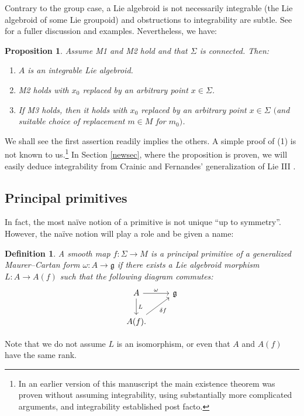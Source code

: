 \documentclass[11pt]{article}
\numberwithin{equation}{section}
\numberwithin{equation}{section}
\newtheorem{Proposition}[Theorem]{Proposition}
\newtheorem{Definition}[Theorem]{Definition}
\begin{document}
Contrary to the group case, a Lie algebroid is not necessarily
integrable (the Lie algebroid of some Lie groupoid) and obstructions
to integrability are subtle. See \cite{Crainic_Fernandes_11} for a
fuller discussion and examples. Nevertheless, we have:
\begin{Proposition}\label{frogP}
Assume {\normalfont M1} and {\normalfont M2} hold
and that $\Sigma$ is connected. Then:
 \begin{enumerate}\itemsep=0pt
 \item[$1.$] $A$ is an integrable Lie algebroid.%
 \item[$2.$] {\normalfont M2} holds with $x_0$ replaced by an arbitrary
point $x \in \Sigma $.%
 \item[$3.$] If {\normalfont M3} holds, then it holds with $x_0$
replaced by an arbitrary point $x \in \Sigma $ $($and suitable choice of
replacement $m \in M$ for $m_0)$.%
 \end{enumerate}
\end{Proposition}
%
We shall see the first assertion readily implies the others. A simple
proof of (1) is not known to us.\footnote{In an earlier
 version of this manuscript the main existence theorem was proven
 without assuming integrability, using substantially more complicated
 arguments, and integrability established post facto.} In Section
\ref{newsec}, where the proposition is proven, we will easily deduce
integrability from Crainic and Fernandes' generalization of Lie III
\cite{Crainic_Fernandes_03}.

\subsection*{Principal primitives}

In fact, the most na\"ive notion of a primitive is not unique ``up to
symmetry''. However, the na\"ive notion will play a role and be given a
name:
\begin{Definition}
 A smooth map $f \colon \Sigma \rightarrow M$ is a {\it principal
 primitive} of a generalized Maurer--Cartan form
 $\omega \colon A \rightarrow {\mathfrak g} $ if there exists a Lie
 algebroid morphism $L \colon A \rightarrow A(f)$ such that the
 following diagram commutes:
 \begin{equation}
 \begin{tikzcd} A \arrow{d}{L} \arrow{r}{\omega } & {\mathfrak g}
 \\ A(f). \arrow[swap]{ru}{\delta f} &
 \end{tikzcd}
 \label{carpet:court}
 \end{equation}
\end{Definition}
 Note that we do not assume $L $ is an isomorphism, or even
that $A$ and $A(f)$ have the same rank.
\end{document}
